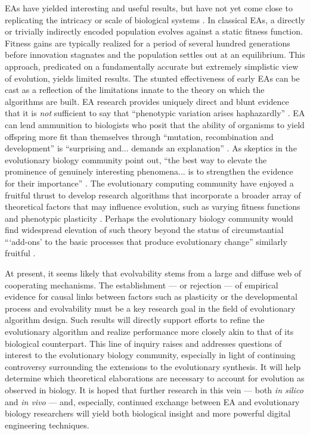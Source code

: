 EAs have yielded interesting and useful results, but have not yet come close to replicating the intricacy or scale of biological systems \cite{Tonelli2011OnSystems}.
In classical EAs, a directly or trivially indirectly encoded population evolves against a static fitness function.
Fitness gains are typically realized for a period of several hundred generations before innovation stagnates and the population settles out at an equilibrium.
This approach, predicated on a fundamentally accurate but extremely simplistic view of evolution, yields limited results.
The stunted effectiveness of early EAs can be cast as a reflection of the limitations innate to the theory on which the algorithms are built.
EA research provides uniquely direct and blunt evidence that it is \textit{not} sufficient to say that ``phenotypic variation arises haphazardly'' \cite[p 219]{Kirschner2005TheDilemma}.
EA can lend ammunition to biologists who posit that the ability of organisms to yield offspring more fit than themselves through ``mutation, recombination and development'' is ``surprising and... demands an explanation'' \cite{Draghi2008EVOLUTIONMODEL}.
As skeptics in the evolutionary biology community point out, ``the best way to elevate the prominence of genuinely interesting phenomena... is to strengthen the evidence for their importance'' \cite{Laland2014DoesRethink}.
The evolutionary computing community have enjoyed a fruitful thrust to develop research algorithms that incorporate a broader array of theoretical factors that may influence evolution, such as varying fitness functions and phenotypic plasticity \cite{Kashtan2007VaryingEvolution,Moczek2011TheInnovation,Downing2012HeterochronousBaldwinism}. Perhaps the evolutionary biology community would find widespread elevation of such theory beyond the status of circumstantial ``‘add-ons’ to the basic processes that produce evolutionary change'' similarly fruitful \cite{Laland2014DoesRethink}. 

At present, it seems likely that evolvability stems from a large and diffuse web of cooperating mechanisms.
The establishment --- or rejection --- of empirical evidence for causal links between factors such as plasticity or the developmental process and evolvability must be a key research goal in the field of evolutionary algorithm design.
Such results will directly support efforts to refine the evolutionary algorithm and realize performance more closely akin to that of its biological counterpart.
This line of inquiry raises and addresses questions of interest to the evolutionary biology community, especially in light of continuing controversy surrounding the extensions to the evolutionary synthesis.
It will help determine which theoretical elaborations are necessary to account for evolution as observed in biology.
It is hoped that further research in this vein --- both \textit{in silico} and \textit{in vivo} --- and, especially, continued exchange between EA and evolutionary biology researchers will yield both biological insight and more powerful digital engineering techniques.